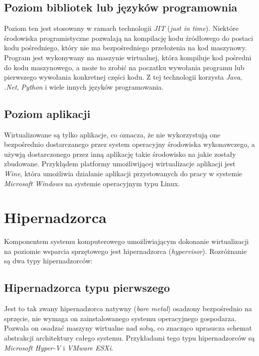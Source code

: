 \documentclass[polish, a4paper, 12pt, oneside]{book}
\begin{document}
\subsection {Poziom bibliotek lub języków programownia}
Poziom ten jest stosowany w ramach technologii \textit{JIT} (\textit{just in time}). Niektóre środowiska programistyczne pozwalają na kompilację kodu źródłowego do postaci kodu pośredniego, który nie ma bezpośredniego przełożenia na kod maszynowy. Program jest wykonywany na maszynie wirtualnej, która kompiluje kod pośredni do kodu maszynowego, a może to zrobić na poczatku wywołania programu lub pierwszego wywołania konkretnej części kodu. Z tej technologii korzysta \textit{Java}\cite{java}, \textit{.Net}\cite{dotnet}, \textit{Python}\cite{python} i wiele innych języków programowania. 
\subsection {Poziom aplikacji}
Wirtualizowane są tylko aplikacje, co oznacza, że nie wykorzystują one bezpośrednio dostarczanego przez system operacyjny środowiska wykonawczego, a używją dostarczonego przez inną aplikację takie środowisko na jakie zostały zbudowane. Przykłądem platformy umożliwijącej wirtualizacje aplikacji jest \textit{Wine}\cite{wine}, która umożliwia działanie aplikacji przystowanych do pracy w systemie \textit{Microsoft Windows}\cite{windows} na systemie operacyjnym typu Linux.
 
\section{Hipernadzorca}
Komponentem systemu komputerowego umożliwiającym dokonanie wirtualizacji na poziomie wsparcia sprzętowego jest hipernadzorca (\textit{hypervisor}). Rozróżnanie są dwa typy hipernadzorców:

\subsection {Hipernadzorca typu pierwszego} 
Jest to tak zwany hipernadzorca natywny (\textit{bare metal}) osadzony bezpośrednio na sprzęcie, nie wymaga on zainstalowanego systemu operacyjnego gospodarza. Pozwala on osadzać maszyny wirtualne nad sobą, co znacząco upraszcza schemat abstrakcji architektury całego systemu. Przykładami tego typu hipernadzorców są \textit{Microsoft Hyper-V}\cite{hyperv} i \textit{VMware ESXi}\cite{vmwareesx}.
\end{document}
